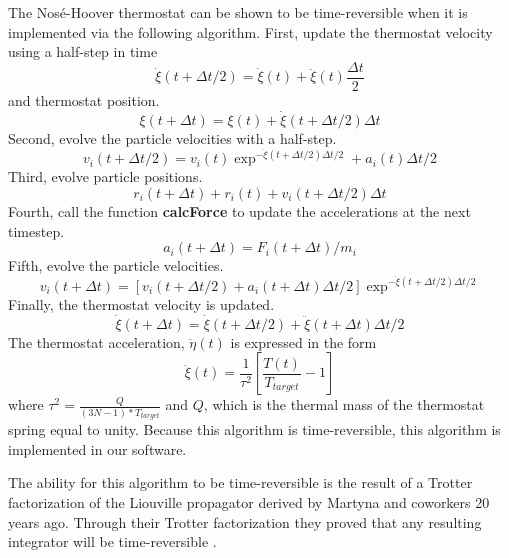 \documentclass[12pt]{article}
\begin{document}
The Nos\'{e}-Hoover thermostat can be shown to be time-reversible when it is implemented via the following algorithm.
First, update the thermostat velocity using a half-step in time
\begin{equation}
\dot{\xi} (t+ \Delta t/2) = \dot{\xi}(t) + \ddot{\xi}(t) \frac{\Delta t}{2}
\end{equation}
and thermostat position.
\begin{equation}
\xi (t+ \Delta t) = \xi(t) + \dot{\xi}(t+\Delta t/2)\Delta t
\end{equation}
Second, evolve the particle velocities with a half-step.
\begin{equation}
v_i (t+\Delta t/2) = v_i (t) \exp^{-\dot{\xi}(t+\Delta t/2) \Delta t/2} + a_{i} (t) \Delta t/2
\end{equation}
Third, evolve particle positions.
\begin{equation}
r_{i} (t+\Delta t) + r_{i} (t) + v_{i}(t+ \Delta t/2) \Delta t
\end{equation}
Fourth, call the function \textbf{calcForce} to update the accelerations at the next timestep.
\begin{equation}
a_{i} (t+\Delta t) = F_{i} (t+ \Delta t)/m_{i}
\end{equation}
Fifth, evolve the particle velocities.
\begin{equation}
v_{i} (t+ \Delta t)  = [v_{i}(t+\Delta t/2) + a_{i}(t+\Delta t) \Delta t/2]\exp^{-\dot{\xi}(t+\Delta t/2) \Delta t/2}
\end{equation}
Finally, the thermostat velocity is updated.
\begin{equation}
\dot{\xi}(t+\Delta t) = \dot{\xi} (t+\Delta t/2) + \ddot{\xi} (t+\Delta t) \Delta t /2
\end{equation}
The thermostat acceleration, $\ddot{\eta}(t)$ is expressed in the form
\begin{equation}
\ddot{\xi}(t) = \frac{1}{\tau^{2}} [\frac{T(t)}{T_{target}} -1 ]
\end{equation}
where $\tau^{2} = \frac{Q}{(3N-1)*T_{target}}$ and $Q$, which is the thermal mass of the thermostat spring equal to unity.
Because this algorithm is time-reversible, this algorithm is implemented in our software.

The ability for this algorithm to be time-reversible is the result of a Trotter factorization of the Liouville propagator derived by Martyna and coworkers 20 years ago. Through their Trotter factorization they proved that any resulting integrator will be time-reversible \cite{Tuckerman1992}.
\end{document}
